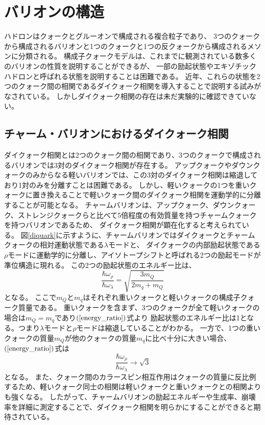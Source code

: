\section{バリオンの構造}
ハドロンはクォークとグルーオンで構成される複合粒子であり、
3つのクォークから構成されるバリオンと1つのクォークと1つの反クォークから構成されるメソンに分類される。
構成子クォークモデルは、これまでに観測されている数多くのバリオンの性質を説明することができるが、
一部の励起状態やエキゾチックハドロンと呼ばれる状態を説明することは困難である。
近年、これらの状態を2つのクォーク間の相関であるダイクォーク相関を導入することで説明する試みがなされている\cite{ref1}。
しかしダイクォーク相関の存在は未だ実験的に確認できていない。

\subsection{チャーム・バリオンにおけるダイクォーク相関}
ダイクォーク相関とは2つのクォーク間の相関であり、3つのクォークで構成されるバリオンでは3対のダイクォーク相関が存在する。
アップクォークやダウンクォークのみからなる軽いバリオンでは、この3対のダイクォーク相関は縮退しており1対のみを分離すことは困難である。
しかし、軽いクォークの1つを重いクォークに置き換えることで軽いクォーク間のダイクォーク相関を運動学的に分離することが可能となる。
チャームバリオンは、アップクォーク、ダウンクォーク、ストレンジクォークらと比べて5倍程度の有効質量を持つチャームクォークを持つバリオンであるため、
ダイクォーク相関が顕在化すると考えられている。
図\ref{diquark}に示すように、チャームバリオンではダイクォークとチャームクォークの相対運動状態である$\lambda$モードと、
ダイクォークの内部励起状態である$\rho$モードに運動学的に分離し、アイソトープシフトと呼ばれる2つの励起モードが準位構造に現れる。
この2つの励起状態のエネルギー比は、
\begin{equation}
  \label{energy_ratio}
  \frac{\hbar\omega_{\rho}}{\hbar\omega_{\lambda}}=\sqrt{\frac{3m_{Q}}{2m_{q}+m_{Q}}}
\end{equation}
となる。
ここで$m_Q$と$m_q$はそれぞれ重いクォークと軽いクォークの構成子クォーク質量である。
重いクォークを含まず、3つのクォークが全て軽いクォークの場合は$m_Q=m_q$であり$(\ref{energy_ratio})$式より
励起状態のエネルギー比は1となる。つまり$\lambda$モードと$\rho$モードは縮退していることがわかる。
一方で、1つの重いクォークの質量$m_Q$が他のクォークの質量$m_q$に比べ十分に大きい場合、$(\ref{energy_ratio})$式は
\begin{equation}
  \label{energy_ratio2}
  \frac{\hbar\omega_{\rho}}{\hbar\omega_{\lambda}}\longrightarrow\sqrt{3}
\end{equation}
となる。
また、クォーク間のカラースピン相互作用はクォークの質量に反比例するため、軽いクォーク同士の相関は軽いクォークと重いクォークとの相関よりも強くなる。
したがって、チャームバリオンの励起エネルギーや生成率、崩壊率を詳細に測定することで、ダイクォーク相関を明らかにすることができると期待されている。